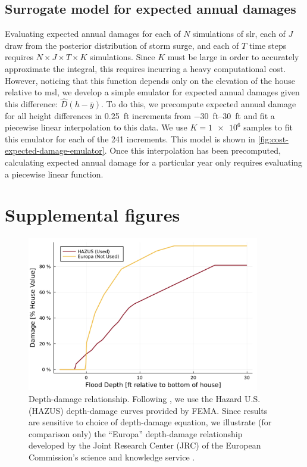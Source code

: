 \documentclass[12pt]{article}
\begin{document}
\subsection{Surrogate model for expected annual damages}\label{sec:surrogate-ead}
Evaluating expected annual damages for each of $N$ simulations of \gls{slr}, each of $J$ draw from the posterior distribution of storm surge, and each of $T$ time steps requires $N \times J \times T \times K$ simulations.
Since $K$ must be large in order to accurately approximate the integral, this requires incurring a heavy computational cost.
However, noticing that this function depends only on the elevation of the house relative to \gls{msl}, we develop a simple emulator for expected annual damages given this difference: $\hat{D}(h - \overline{y})$.
To do this, we  precompute expected annual damage for all height differences in \SI{0.25}{ft} increments from \SIrange{-30}{30}{ft} and fit a piecewise linear interpolation to this data.
We use $K=\num{1e6}$ samples to fit this emulator for each of the 241 increments.
This model is shown in \cref{fig:cost-expected-damage-emulator}.
Once this interpolation has been precomputed, calculating expected annual damage for a particular year only requires evaluating a piecewise linear function.

\section{Supplemental figures}

\begin{figure}
    \centering
    \includegraphics[width=4in]{cost-depth-damage}
    \caption{
        Depth-damage relationship.
        Following \citet{zarekarizi_suboptimal:2020}, we use the Hazard U.S. (HAZUS) depth-damage curves provided by FEMA.
        Since results are sensitive to choice of depth-damage equation, we illustrate (for comparison only) the ``Europa'' depth-damage relationship developed by the Joint Research Center (JRC) of the European Commission's science and knowledge service \citep{huizinga_depthdamage:2016}.
    }\label{fig:cost-depth-damage}
\end{figure}
\end{document}
